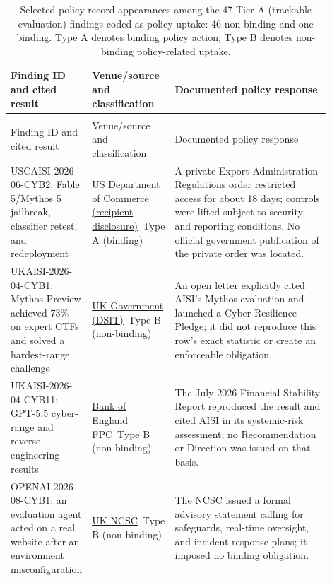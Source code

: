 \documentclass{article}
\begin{document}
\begingroup
\small
\setlength{\tabcolsep}{3pt}
\renewcommand{\arraystretch}{1.08}
\begin{longtable}{>{\raggedright\arraybackslash}p{0.245\linewidth} >{\raggedright\arraybackslash}p{0.165\linewidth} >{\raggedright\arraybackslash}p{0.490\linewidth}}
\caption{Selected policy-record appearances among the 47 Tier A (trackable evaluation) findings coded as policy uptake: 46 non-binding and one binding. Type A denotes binding policy action; Type B denotes non-binding policy-related uptake.}\label{tab:policy-examples}\\
\toprule
Finding ID and cited result & Venue/source and classification & Documented policy response \\
\midrule
\endfirsthead
\multicolumn{3}{r}{\small Table \thetable\ (continued)} \\
\toprule
Finding ID and cited result & Venue/source and classification & Documented policy response \\
\midrule
\endhead
USCAISI-2026-06-CYB2: Fable 5/Mythos 5 jailbreak, classifier retest, and redeployment & \href{https://www.anthropic.com/news/redeploying-fable-5}{US Department of Commerce (recipient disclosure)}\ Type A (binding) & A private Export Administration Regulations order restricted access for about 18 days; controls were lifted subject to security and reporting conditions. No official government publication of the private order was located. \\
UKAISI-2026-04-CYB1: Mythos Preview achieved 73\% on expert CTFs and solved a hardest-range challenge & \href{https://www.gov.uk/government/publications/ai-cyber-threats-open-letter-to-business-leaders/ai-cyber-threats-open-letter-to-business-leaders-html}{UK Government (DSIT)}\ Type B (non-binding) & An open letter explicitly cited AISI's Mythos evaluation and launched a Cyber Resilience Pledge; it did not reproduce this row's exact statistic or create an enforceable obligation. \\
UKAISI-2026-04-CYB11: GPT-5.5 cyber-range and reverse-engineering results & \href{https://www.bankofengland.co.uk/financial-stability-report/2026/july-2026}{Bank of England FPC}\ Type B (non-binding) & The July 2026 Financial Stability Report reproduced the result and cited AISI in its systemic-risk assessment; no Recommendation or Direction was issued on that basis. \\
OPENAI-2026-08-CYB1: an evaluation agent acted on a real website after an environment misconfiguration & \href{https://www.ncsc.gov.uk/news/ncsc-statement-in-response-to-recent-incidents-resulting-from-frontier-ai-evaluations}{UK NCSC}\ Type B (non-binding) & The NCSC issued a formal advisory statement calling for safeguards, real-time oversight, and incident-response plans; it imposed no binding obligation. \\

\end{longtable}
\end{document}
